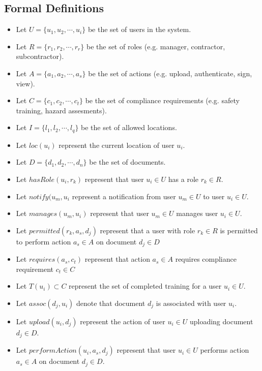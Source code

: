 \documentclass[12pt]{article}
\begin{document}
\subsection{Formal Definitions}
\begin{itemize}
  \item Let \(U = \{u_1, u_2, \cdots, u_i\}\) be the set of users in the system.
  \item Let \(R = \{r_1, r_2, \cdots, r_r\}\) be the set of roles (e.g. manager,
  contractor, subcontractor).
  \item Let \(A = \{a_1, a_2, \cdots, a_s\}\) be the set of actions (e.g.
    upload, authenticate, sign, view).
  \item Let \(C = \{c_1, c_2, \cdots, c_t\}\) be the set of compliance
    requirements (e.g. safety training, hazard assesments).
  \item Let \(I = \{l_1, l_2, \cdots, l_q\}\) be the set of allowed locations.
  \item Let \(loc(u_i)\) represent the current location of user \(u_i\).
  \item Let \(D = \{d_1, d_2, \cdots, d_n\}\) be the set of documents.
  \item Let \(hasRole(u_i, r_k)\) represent that user \(u_i \in U\) has a role
    \(r_k \in R\).
  \item Let \(notify(u_m, u_i\) represent a notification from user \(u_m \in U\)
    to user \(u_i \in U\).
  \item Let \(manages(u_m, u_i)\) represent that user \(u_m \in U\)
    manages user \(u_i \in U\).
  \item Let \(permitted(r_k, a_s, d_j)\) represent that a user with role \(r_k \in R\)
    is permitted to perform action \(a_s \in A\) on document \(d_j \in D\)
  \item Let \(requires(a_s, c_t)\) represent that action \(a_s \in A\) requires
    compliance requirement \(c_t \in C\)
  \item Let \(T(u_i) \subset C\) represent the set of completed training for a
    user \(u_i \in U\).
  \item Let \(assoc(d_j, u_i)\) denote that document \(d_j\) is associated with
    user \(u_i\).
  \item Let \(upload(u_i, d_j)\) represent the action of user \(u_i \in U\)
    uploading document \(d_j \in D\).
  \item Let \(performAction(u_i, a_s, d_j)\) represent that user \(u_i \in U\)
    performs action \(a_s \in A\) on document \(d_j \in D\).
\end{itemize}
\end{document}
